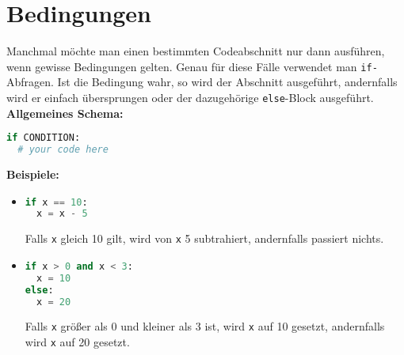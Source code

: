 \documentclass{article}
\begin{document}
	\section{Bedingungen}
	Manchmal möchte man einen bestimmten Codeabschnitt nur dann ausführen, wenn gewisse Bedingungen gelten. Genau für diese Fälle verwendet man \texttt{if-}Abfragen. Ist die Bedingung wahr, so wird der Abschnitt ausgeführt, andernfalls wird er einfach übersprungen oder der dazugehörige \texttt{else}-Block ausgeführt.\\
	\textbf{Allgemeines Schema:}
	\begin{lstlisting}[language=Python]
if CONDITION:
  # your code here
	\end{lstlisting}
	\textbf{Beispiele:}
	\begin{itemize}
		\item \begin{lstlisting}[language=Python]
if x == 10:
  x = x - 5
		\end{lstlisting}
		Falls \texttt{x} gleich 10 gilt, wird von \texttt{x} 5 subtrahiert, andernfalls passiert nichts.
		
		\item \begin{lstlisting}[language=Python]
if x > 0 and x < 3:
  x = 10
else:
  x = 20
		\end{lstlisting}
		Falls \texttt{x} größer als 0 und kleiner als 3 ist, wird \texttt{x} auf 10 gesetzt, andernfalls wird \texttt{x} auf 20 gesetzt.
	\end{itemize}
	
\end{document}
